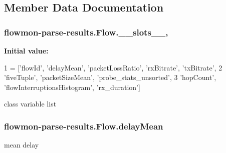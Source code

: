 \subsection{Member Data Documentation}
\subsubsection[{\texorpdfstring{\+\_\+\+\_\+slots\+\_\+\+\_\+}{__slots__}}]{\setlength{\rightskip}{0pt plus 5cm}flowmon-\/parse-\/results.\+Flow.\+\_\+\+\_\+slots\+\_\+\+\_\+\hspace{0.3cm}{\ttfamily [static]}, {\ttfamily [private]}}\hypertarget{classflowmon-parse-results_1_1Flow_adc84d2a98a3dfd7addbbb7e7b4d67a8d}{}\label{classflowmon-parse-results_1_1Flow_adc84d2a98a3dfd7addbbb7e7b4d67a8d}
{\bfseries Initial value\+:}
\begin{DoxyCode}
1 = [\textcolor{stringliteral}{'flowId'}, \textcolor{stringliteral}{'delayMean'}, \textcolor{stringliteral}{'packetLossRatio'}, \textcolor{stringliteral}{'rxBitrate'}, \textcolor{stringliteral}{'txBitrate'},
2                  \textcolor{stringliteral}{'fiveTuple'}, \textcolor{stringliteral}{'packetSizeMean'}, \textcolor{stringliteral}{'probe\_stats\_unsorted'},
3                  \textcolor{stringliteral}{'hopCount'}, \textcolor{stringliteral}{'flowInterruptionsHistogram'}, \textcolor{stringliteral}{'rx\_duration'}]
\end{DoxyCode}


class variable list 

\subsubsection[{\texorpdfstring{delay\+Mean}{delayMean}}]{\setlength{\rightskip}{0pt plus 5cm}flowmon-\/parse-\/results.\+Flow.\+delay\+Mean}\hypertarget{classflowmon-parse-results_1_1Flow_ac8365a583c4b8896bc96fac3d35f7cbe}{}\label{classflowmon-parse-results_1_1Flow_ac8365a583c4b8896bc96fac3d35f7cbe}


mean delay 

